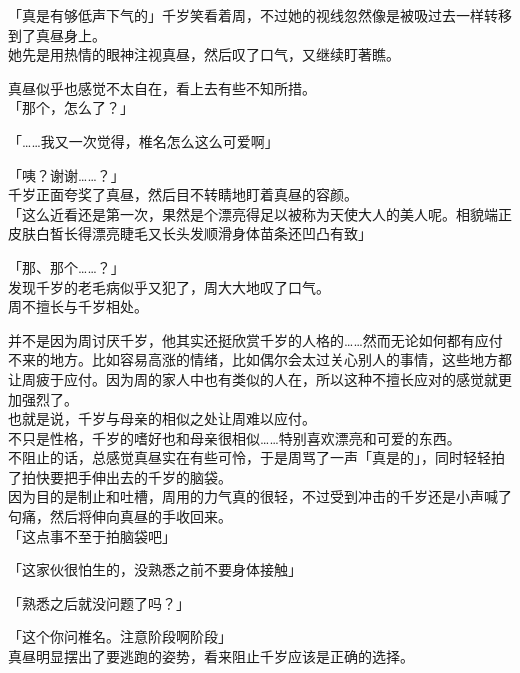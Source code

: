 「真是有够低声下气的」千岁笑看着周，不过她的视线忽然像是被吸过去一样转移到了真昼身上。\\

她先是用热情的眼神注视真昼，然后叹了口气，又继续盯著瞧。

真昼似乎也感觉不太自在，看上去有些不知所措。\\

「那个，怎么了？」

「……我又一次觉得，椎名怎么这么可爱啊」%

「咦？谢谢……？」\\

千岁正面夸奖了真昼，然后目不转睛地盯着真昼的容颜。\\

「这么近看还是第一次，果然是个漂亮得足以被称为天使大人的美人呢。相貌端正皮肤白皙长得漂亮睫毛又长头发顺滑身体苗条还凹凸有致」

「那、那个……？」\\

发现千岁的老毛病似乎又犯了，周大大地叹了口气。\\

周不擅长与千岁相处。

并不是因为周讨厌千岁，他其实还挺欣赏千岁的人格的……然而无论如何都有应付不来的地方。比如容易高涨的情绪，比如偶尔会太过关心别人的事情，这些地方都让周疲于应付。因为周的家人中也有类似的人在，所以这种不擅长应对的感觉就更加强烈了。\\

也就是说，千岁与母亲的相似之处让周难以应付。\\

不只是性格，千岁的嗜好也和母亲很相似……特别喜欢漂亮和可爱的东西。\\

不阻止的话，总感觉真昼实在有些可怜，于是周骂了一声「真是的」，同时轻轻拍了拍快要把手伸出去的千岁的脑袋。\\

因为目的是制止和吐槽，周用的力气真的很轻，不过受到冲击的千岁还是小声喊了句痛，然后将伸向真昼的手收回来。\\

「这点事不至于拍脑袋吧」

「这家伙很怕生的，没熟悉之前不要身体接触」

「熟悉之后就没问题了吗？」

「这个你问椎名。注意阶段啊阶段」\\

真昼明显摆出了要逃跑的姿势，看来阻止千岁应该是正确的选择。\\


